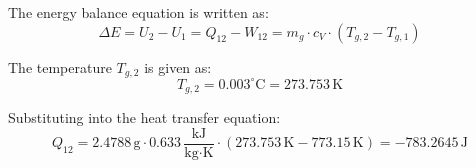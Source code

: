 The energy balance equation is written as:  
\[
\Delta E = U_2 - U_1 = Q_{12} - W_{12} = m_g \cdot c_V \cdot (T_{g,2} - T_{g,1})
\]  

The temperature \( T_{g,2} \) is given as:  
\[
T_{g,2} = 0.003^\circ\text{C} = 273.753 \, \text{K}
\]  

Substituting into the heat transfer equation:  
\[
Q_{12} = 2.4788 \, \text{g} \cdot 0.633 \, \frac{\text{kJ}}{\text{kg·K}} \cdot (273.753 \, \text{K} - 773.15 \, \text{K}) = -783.2645 \, \text{J}
\]